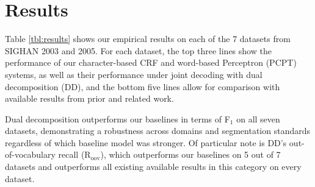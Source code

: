 \section{Results}

Table \ref{tbl:results} shows our empirical results on each of the 7 datasets from SIGHAN 2003 and 2005. For each dataset, the top three lines show the performance of our character-based CRF and word-based Perceptron (PCPT) systems, as well as their performance under joint decoding with dual decomposition (DD), and the bottom five lines allow for comparison with available results from prior and related work.

Dual decomposition outperforms our baselines in terms of F$_1$ on all seven datasets, demonstrating a robustness across domains and segmentation standards regardless of which baseline model was stronger. Of particular note is DD's out-of-vocabulary recall (R$_{\mathrm{oov}}$), which outperforms our baselines on 5 out of 7 datasets and outperforms all existing available results in this category on every dataset. 



%



